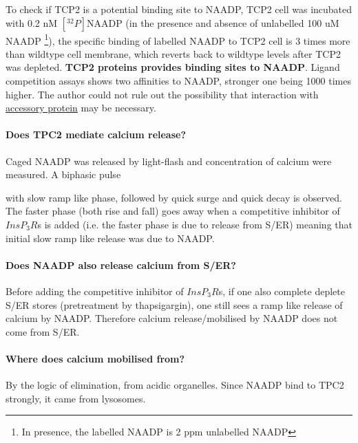 \documentclass[twocolumn]{article}
\begin{document}
To check if TCP2 is a potential binding site to NAADP,  TCP2 cell was incubated
with 0.2 nM $[{}^{32}P]$NAADP (in the presence and absence of unlabelled 100 uM
NAADP \footnote{In presence, the labelled NAADP is 2 ppm unlabelled NAADP}), the
specific binding of labelled NAADP to TCP2 cell is 3 times more than wildtype
cell membrane, which reverts back to wildtype levels after TCP2 was depleted.
{\bf TCP2 proteins provides binding sites to NAADP}. Ligand competition assays
shows two affinities to NAADP, stronger one being 1000 times higher. The author
could not rule out the possibility that interaction with
\href{http://beginw.ncbi.nlm.nih.gov/pubmed/16402902}{accessory protein} may be
necessary.

\paragraph{Does TPC2 mediate calcium release?} Caged NAADP was released by
light-flash and concentration of calcium were measured. A biphasic pulse
 with slow ramp like phase, followed by quick surge and quick
decay is observed. The faster phase (both rise and fall) goes away when a
competitive inhibitor of $InsP_3R$s is added (i.e. the faster phase is due to
release from S/ER) meaning that initial slow ramp like release was due to NAADP.

\paragraph{Does NAADP also release calcium from S/ER?} Before adding the
competitive inhibitor of $InsP_3R$s, if one also complete deplete S/ER stores
(pretreatment by thapsigargin), one still sees a ramp like release of calcium by
NAADP. Therefore calcium release/mobilised by NAADP does not come from S/ER.

\paragraph{Where does calcium mobilised from?} By the logic of elimination, from
acidic organelles. Since NAADP bind to TPC2 strongly, it came from lysosomes.
\end{document}
